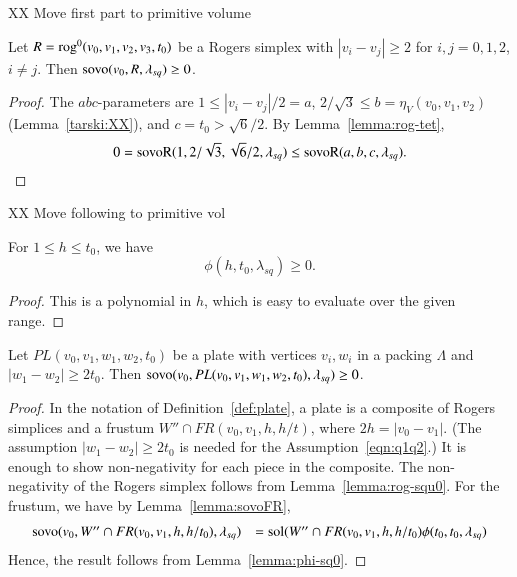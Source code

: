 XX Move first part to primitive volume

\begin{lemma}\label{lemma:rog-squ0}
Let $R={\operatorname{rog}}^0(v_0,v_1,v_2,v_3,t_0)$ be a Rogers simplex
with $|v_i-v_j|\ge 2$ for $i,j=0,1,2$, $i\ne j$.
Then ${\operatorname{sovo}}(v_0,R,\lambda_{sq})\ge 0$.
\end{lemma}

\begin{proof}
The $abc$-parameters are $1 \le |v_i-v_j|/2 = a$,
$2/\sqrt{3}\le b = \eta_V(v_0,v_1,v_2)$ (Lemma~\ref{tarski:XX}),
and $c = t_0 > \sqrt6/2$.  By Lemma~\ref{lemma:rog-tet},
$$
0 = {\operatorname{sovoR}}(1,2/\sqrt{3},\sqrt{6}/2,\lambda_{sq}) 
   \le {\operatorname{sovoR}}(a,b,c,\lambda_{sq}).
$$
\end{proof}

XX Move following to primitive vol

\begin{lemma}\label{lemma:phi-sq0}
For $1\le h\le t_0$, we have
$$
\phi(h,t_0,\lambda_{sq})\ge 0.
$$
\end{lemma}

\begin{proof}
This is a polynomial in $h$, which is easy to evaluate over the
given range.
\end{proof}


\begin{lemma}\label{lemma:pl-sq0}
Let $PL(v_0,v_1,w_1,w_2,t_0)$ be a plate with
vertices $v_i,w_i$ in a packing $\Lambda$ and $|w_1-w_2|\ge 2 t_0$.
Then
${\operatorname{sovo}}(v_0,PL(v_0,v_1,w_1,w_2,t_0),\lambda_{sq}) \ge 0$. 
\end{lemma}

\begin{proof} In the notation of Definition~\ref{def:plate},
a plate is a composite of Rogers simplices and
a frustum $W''\cap FR(v_0,v_1,h,h/t)$,
where $2h = |v_0-v_1|$.  (The assumption $|w_1-w_2|\ge 2 t_0$
is needed for the Assumption~\ref{eqn:q1q2}.)
It is enough to show non-negativity for each piece in the composite.
The non-negativity of the Rogers simplex follows from Lemma~\ref{lemma:rog-squ0}.
For the frustum, we have by Lemma~\ref{lemma:sovoFR},
$$
\begin{array}{lll}
{\operatorname{sovo}}(v_0,W''\cap FR(v_0,v_1,h,h/t_0),\lambda_{sq}) &=
  \operatorname{sol}(W''\cap FR(v_0,v_1,h,h/t_0) \phi(t_0,t_0,\lambda_{sq})\\
\end{array}
$$
Hence, the result follows from Lemma~\ref{lemma:phi-sq0}.
\end{proof}

